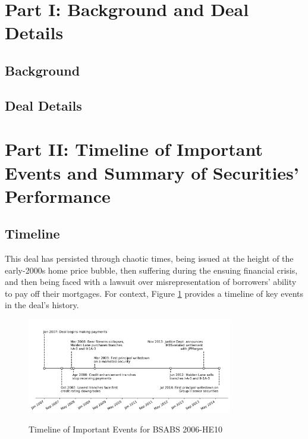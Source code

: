 \documentclass[12pt]{article}
\begin{document}
\section*{Part I: Background and Deal Details}
\subsection*{Background}

\subsection*{Deal Details}

\section*{Part II: Timeline of Important Events and Summary of Securities' Performance}

\subsection*{Timeline}

This deal has persisted through chaotic times, being issued at the height of the early-2000s home price bubble, then suffering during the ensuing financial crisis, and then being faced with a lawsuit over misrepresentation of borrowers’ ability to pay off their mortgages. For context, Figure \ref{fig:timeline_of_important_events} provides a timeline of key events in the deal’s history.

\begin{figure}[h]
	\centering
	\caption{Timeline of Important Events for BSABS 2006-HE10}
	\includegraphics[width=0.8\textwidth]{../figures/timeline_of_important_events}
	\label{fig:timeline_of_important_events}
\end{figure}
\end{document}
